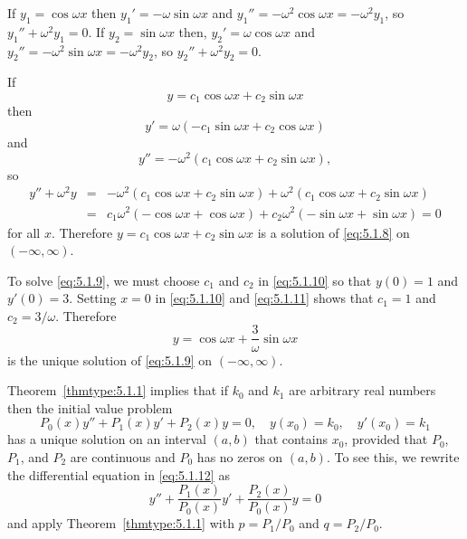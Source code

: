 \begin{examplesolution}
 If $y_{1}=\cos\omega x$ then $y_{1}'=-\omega\sin\omega x$ and
$y_{1}''=-\omega^{2}\cos\omega x=-\omega^{2}y_{1}$, so $y_{1}''+\omega^{2}y_{1}=0$. If
$y_{2}=\sin\omega x$ then, $y_{2}'=\omega\cos\omega x$ and
$y_{2}''=-\omega^{2}\sin\omega x=-\omega^{2}y_{2}$, so $y_{2}''+\omega^{2}y_{2}=0$.

 If
\begin{equation}
  \label{eq:5.1.10}y=c_{1}\cos\omega x+c_{2}\sin\omega x
\end{equation}
then
\begin{equation}
  \label{eq:5.1.11}y'=\omega(-c_{1}\sin\omega x+c_{2}\cos\omega x)
\end{equation}
and
\[
  y''=-\omega^{2}(c_{1}\cos\omega x+c_{2}\sin\omega x),
\]
so
\begin{eqnarray*}
  y''+\omega^{2}y & = & -\omega^{2}(c_{1}\cos\omega x+c_{2}\sin\omega x)+\omega^{2}(c_{1}\cos\omega x+c_{2}\sin\omega x) \\
                  & = & c_{1}\omega^{2}(-\cos\omega x+\cos\omega x)+c_{2}\omega^{2}(-\sin\omega x+\sin\omega x)=0
\end{eqnarray*}
for all $x$. Therefore $y=c_{1}\cos\omega x+c_{2}\sin\omega x$ is a solution of \eqref{eq:5.1.8} on
$(-\infty,\infty)$.

 To solve \eqref{eq:5.1.9}, we must choose $c_{1}$ and $c_{2}$ in
\eqref{eq:5.1.10} so that $y(0)=1$ and $y'(0)=3$. Setting $x=0$ in \eqref{eq:5.1.10} and
\eqref{eq:5.1.11} shows that $c_{1}=1$ and $c_{2}=3/\omega$. Therefore
\[
  y=\cos\omega x+\frac{3}{\omega}\sin\omega x
\]
is the unique solution of \eqref{eq:5.1.9} on $(-\infty,\infty)$. \bbox
\end{examplesolution}

Theorem~\ref{thmtype:5.1.1} implies that if $k_{0}$ and $k_{1}$ are arbitrary real numbers then the
initial value problem
\begin{equation}
  \label{eq:5.1.12}P_{0}(x)y''+P_{1}(x)y'+P_{2}(x)y=0,\quad y(x_{0})=k_{0},\quad y'(x_{0})=k_{1}
\end{equation}
has a unique solution on an interval $(a,b)$ that contains $x_{0}$, provided that $P_{0}$, $P_{1}$,
and $P_{2}$ are continuous and $P_{0}$ has no zeros on $(a,b)$. To see this, we rewrite the
differential equation in \eqref{eq:5.1.12} as
\[
  y''+\frac{P_{1}(x)}{P_{0}(x)}y'+\frac{P_{2}(x)}{P_{0}(x)}y=0
\]
and apply Theorem~\ref{thmtype:5.1.1} with $p=P_{1}/P_{0}$ and $q=P_{2}/P_{0}$.

